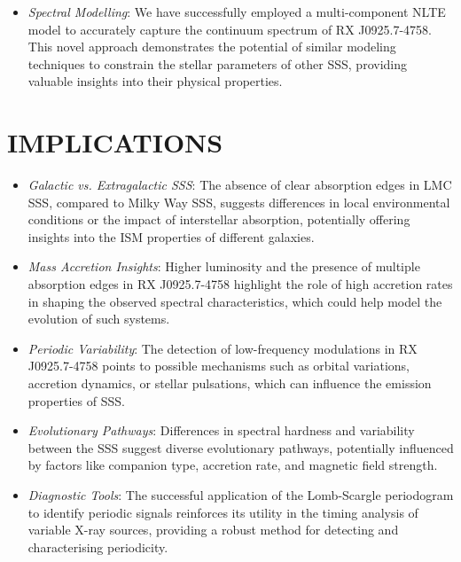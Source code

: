 \begin{itemize}
    	\item \textit{Spectral Modelling}: We have successfully employed a multi-component NLTE model to accurately capture the continuum spectrum of RX J0925.7-4758. This novel approach demonstrates the potential of similar modeling techniques to constrain the stellar parameters of other SSS, providing valuable insights into their physical properties.
    \end{itemize}
    
    \section{\MakeUppercase{Implications}}
    	\begin{itemize}
    		\item \textit{Galactic vs. Extragalactic SSS}: The absence of clear absorption edges in LMC SSS, compared to Milky Way SSS, suggests differences in local environmental conditions or the impact of interstellar absorption, potentially offering insights into the ISM properties of different galaxies.
    		
    		\item \textit{Mass Accretion Insights}: Higher luminosity and the presence of multiple absorption edges in RX J0925.7-4758 highlight the role of high accretion rates in shaping the observed spectral characteristics, which could help model the evolution of such systems.
    		
    		\item \textit{Periodic Variability}: The detection of low-frequency modulations in RX J0925.7-4758 points to possible mechanisms such as orbital variations, accretion dynamics, or stellar pulsations, which can influence the emission properties of SSS.
    		
    		\item \textit{Evolutionary Pathways}: Differences in spectral hardness and variability between the SSS suggest diverse evolutionary pathways, potentially influenced by factors like companion type, accretion rate, and magnetic field strength.
    		
    		\item \textit{Diagnostic Tools}: The successful application of the Lomb-Scargle periodogram to identify periodic signals reinforces its utility in the timing analysis of variable X-ray sources, providing a robust method for detecting and characterising periodicity.
    	\end{itemize}
    
